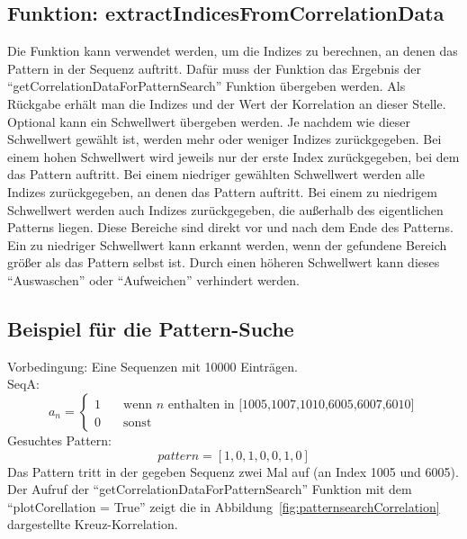 \subsection{Funktion: extractIndicesFromCorrelationData}
Die Funktion kann verwendet werden, um die Indizes zu berechnen, an denen das Pattern in der Sequenz auftritt. Dafür muss der Funktion das Ergebnis der \enquote{getCorrelationDataForPatternSearch} Funktion
übergeben werden. Als Rückgabe erhält man die Indizes und der Wert der Korrelation an dieser Stelle.\\
Optional kann ein Schwellwert übergeben werden. Je nachdem wie dieser Schwellwert gewählt ist, werden mehr oder weniger Indizes zurückgegeben. Bei einem hohen Schwellwert wird 
jeweils nur der erste Index zurückgegeben, bei dem das Pattern auftritt. Bei einem niedriger gewählten Schwellwert werden alle Indizes zurückgegeben, an denen das Pattern auftritt. 
Bei einem zu niedrigem Schwellwert werden auch Indizes zurückgegeben, die außerhalb des eigentlichen Patterns liegen. Diese Bereiche sind direkt vor und nach dem Ende des Patterns. Ein zu niedriger Schwellwert kann erkannt werden, wenn der gefundene Bereich größer als das Pattern selbst ist. Durch einen höheren Schwellwert kann dieses \enquote{Auswaschen} oder \enquote{Aufweichen} verhindert werden.

\subsection{Beispiel für die Pattern-Suche}
Vorbedingung: Eine Sequenzen mit 10000 Einträgen. \\
SeqA:
\[ a_{n} =
  \begin{cases}
    1       & \quad \text{wenn } n \text{ enthalten in [1005,1007,1010,6005,6007,6010]}\\
    0  & \quad \text{sonst}
  \end{cases}
\]
Gesuchtes Pattern:
\[
pattern = [1,0,1,0,0,1,0] 
\]
Das Pattern tritt in der gegeben Sequenz zwei Mal auf (an Index 1005 und 6005).
Der Aufruf der \enquote{getCorrelationDataForPatternSearch} Funktion mit dem \enquote{plotCorellation = True} zeigt die in Abbildung~\ref{fig:patternsearchCorrelation} dargestellte Kreuz-Korrelation.

